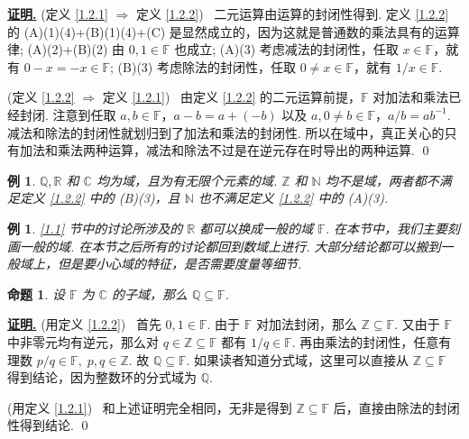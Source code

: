 \documentclass[10pt,openany]{article}
\theoremstyle{thmstyle} %
\theoremstyle{defstyle} %
\theoremstyle{prostyle} %
\newtheorem{proposition}[theorem]{命题}
\theoremstyle{exastyle}
\newtheorem{example}[theorem]{例}
\theoremstyle{remstyle}
\renewenvironment{proof}[1][证明]{\par\underline{\textbf{#1.}} \;\fangsong}{\qed\par}
\newcommand{\F}{\mathbb{F}}
\begin{document}
\begin{proof}
	(定义 \ref{1.2.1}  \( \Rightarrow \) 定义 \ref{1.2.2}) \ 二元运算由运算的封闭性得到. 定义 \ref{1.2.2} 的 (A)(1)(4)+(B)(1)(4)+(C) 是显然成立的，因为这就是普通数的乘法具有的运算律; (A)(2)+(B)(2) 由 \( 0,1 \in \F \) 也成立; (A)(3) 考虑减法的封闭性，任取 \( x \in \F \)，就有 \( 0-x=-x \in \F \); (B)(3) 考虑除法的封闭性，任取 \( 0 \neq x \in \F \)，就有 \( 1/x \in \F \).
	
	\vspace{1ex}
	
	(定义 \ref{1.2.2}  \( \Rightarrow \) 定义 \ref{1.2.1}) \ 由定义 \ref{1.2.2} 的二元运算前提，\( \F \) 对加法和乘法已经封闭. 注意到任取 \( a,b \in \F \)，\( a-b=a+(-b) \) 以及 \( a, 0 \neq b \in \F \)，\( a/b=ab^{-1} \). 减法和除法的封闭性就划归到了加法和乘法的封闭性. 所以在域中，真正关心的只有加法和乘法两种运算，减法和除法不过是在逆元存在时导出的两种运算.
\end{proof}

\begin{example}
	\( \mathbb{Q}, \mathbb{R} \) 和 \( \mathbb{C} \) 均为域，且为有无限个元素的域. \( \mathbb{Z} \) 和 \( \mathbb{N} \) 均不是域，两者都不满足定义 \ref{1.2.2} 中的 (B)(3)，且 \( \mathbb{N} \) 也不满足定义 \ref{1.2.2} 中的 (A)(3).
\end{example}

\begin{example}
	\ref{1.1} 节中的讨论所涉及的 \( \mathbb{R} \) 都可以换成一般的域 \( \F \). 在本节中，我们主要刻画一般的域. 在本节之后所有的讨论都回到数域上进行. 大部分结论都可以搬到一般域上，但是要小心域的特征，是否需要度量等细节.
\end{example}

\begin{proposition}\label{1.2.6}
	设 \( \F \) 为 \( \mathbb{C} \) 的子域，那么 \( \mathbb{Q} \subseteq \F \).
	
\end{proposition}

\begin{proof}
	(用定义 \ref{1.2.2}) \ 首先 \( 0,1 \in \F \). 由于 \( \F \) 对加法封闭，那么 \( \mathbb{Z} \subseteq \F \). 又由于 \( \F \) 中非零元均有逆元，那么对 \( q \in \mathbb{Z} \subseteq \F \) 都有 \( 1/q \in \F \). 再由乘法的封闭性，任意有理数 \( p/q \in \F, \; p,q \in \mathbb{Z} \). 故 \( \mathbb{Q} \subseteq \F \). 如果读者知道分式域，这里可以直接从 \( \mathbb{Z} \subseteq \F \) 得到结论，因为整数环的分式域为 \( \mathbb{Q} \).
	
	\vspace{1ex}
	
	(用定义 \ref{1.2.1}) \ 和上述证明完全相同，无非是得到 \( \mathbb{Z} \subseteq \F \) 后，直接由除法的封闭性得到结论.
\end{proof}
\end{document}
